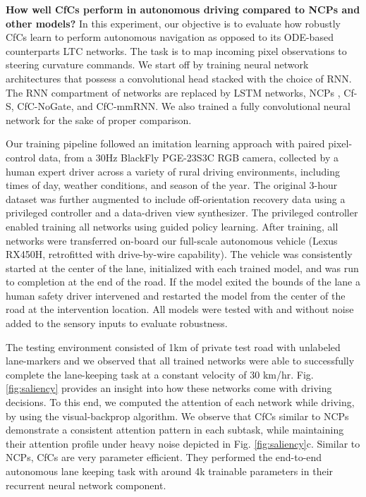 \documentclass[12pt]{article}
\begin{document}
\noindent \textbf{How well CfCs perform in autonomous driving compared to NCPs and other models?} In this experiment, our objective is to evaluate how robustly CfCs learn to perform autonomous navigation as opposed to its ODE-based counterparts LTC networks. The task is to map incoming pixel observations to steering curvature commands. We start off by training neural network architectures that possess a convolutional head stacked with the choice of RNN. The RNN compartment of networks are replaced by LSTM networks, NCPs \cite{lechner2020neural}, Cf-S, CfC-NoGate, and CfC-mmRNN. We also trained a fully convolutional neural network for the sake of proper comparison. 

Our training pipeline followed an imitation learning approach with paired pixel-control data, from a 30Hz BlackFly PGE-23S3C RGB camera, collected by a human expert driver across a variety of rural driving environments, including times of day, weather conditions, and season of the year. The original 3-hour dataset was further augmented to include off-orientation recovery data using a privileged controller\cite{amini2021vista} and a data-driven view synthesizer\cite{amini2020learning}. The privileged controller enabled training all networks using guided policy learning\cite{levine2013guided}. After training, all networks were transferred on-board our full-scale autonomous vehicle (Lexus RX450H, retrofitted with drive-by-wire capability). The vehicle was consistently started at the center of the lane, initialized with each trained model, and was run to completion at the end of the road. If the model exited the bounds of the lane a human safety driver intervened and restarted the model from the center of the road at the intervention location. All models were tested with and without noise added to the sensory inputs to evaluate robustness. 

The testing environment consisted of 1km of private test road with unlabeled lane-markers and we observed that all trained networks were able to successfully complete the lane-keeping task at a constant velocity of 30 km/hr. Fig. \ref{fig:saliency} provides an insight into how these networks come with driving decisions. To this end, we computed the attention of each network while driving, by using the visual-backprop algorithm\cite{bojarski2018visualbackprop}. We observe that CfCs similar to NCPs demonstrate a consistent attention pattern in each subtask, while maintaining their attention profile under heavy noise depicted in Fig. \ref{fig:saliency}c. Similar to NCPs, CfCs are very parameter efficient. They performed the end-to-end autonomous lane keeping task with around 4k trainable parameters in their recurrent neural network component.
\end{document}
